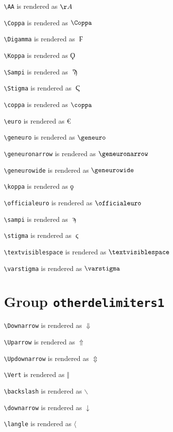 \texttt{\textbackslash AA} is rendered as $\AA$

\texttt{\textbackslash Coppa} is rendered as $\Coppa$

\texttt{\textbackslash Digamma} is rendered as $\Digamma$

\texttt{\textbackslash Koppa} is rendered as $\Koppa$

\texttt{\textbackslash Sampi} is rendered as $\Sampi$

\texttt{\textbackslash Stigma} is rendered as $\Stigma$

\texttt{\textbackslash coppa} is rendered as $\coppa$

\texttt{\textbackslash euro} is rendered as $\euro$

\texttt{\textbackslash geneuro} is rendered as $\geneuro$

\texttt{\textbackslash geneuronarrow} is rendered as $\geneuronarrow$

\texttt{\textbackslash geneurowide} is rendered as $\geneurowide$

\texttt{\textbackslash koppa} is rendered as $\koppa$

\texttt{\textbackslash officialeuro} is rendered as $\officialeuro$

\texttt{\textbackslash sampi} is rendered as $\sampi$

\texttt{\textbackslash stigma} is rendered as $\stigma$

\texttt{\textbackslash textvisiblespace} is rendered as $\textvisiblespace$

\texttt{\textbackslash varstigma} is rendered as $\varstigma$

\section{ Group \texttt{other\textunderscore delimiters1}}

\texttt{\textbackslash Downarrow} is rendered as $\Downarrow$

\texttt{\textbackslash Uparrow} is rendered as $\Uparrow$

\texttt{\textbackslash Updownarrow} is rendered as $\Updownarrow$

\texttt{\textbackslash Vert} is rendered as $\Vert$

\texttt{\textbackslash backslash} is rendered as $\backslash$

\texttt{\textbackslash downarrow} is rendered as $\downarrow$

\texttt{\textbackslash langle} is rendered as $\langle$

